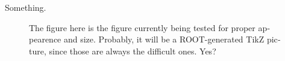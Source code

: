 

\begin{english}

Something.

\begin{figure}

\centering
\begin{minipage}{.69\textwidth}
\begin{infilsf} \tiny

\end{infilsf}
\end{minipage}
\caption{The figure here is the figure currently being tested for
  proper appearence and size. Probably, it will be a ROOT-generated
  TikZ picture, since those are always the difficult ones. Yes?}
\label{fig:my_label}
\end{figure}



\end{english}
